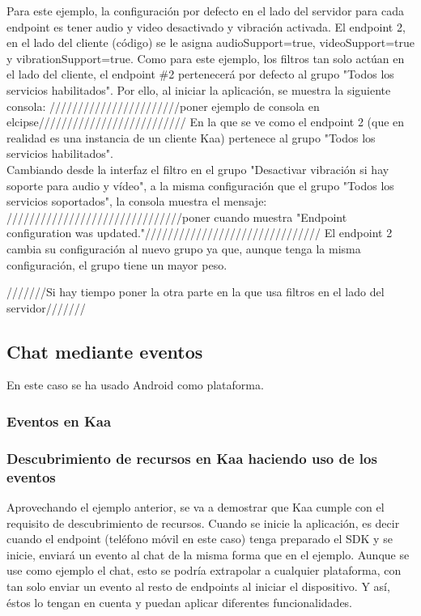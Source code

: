 \documentclass[12pt, twoside]{book}
\begin{document}
Para este ejemplo, la configuración por defecto en el lado del servidor para cada endpoint es tener audio y video desactivado y vibración activada. El endpoint 2, en el lado del cliente (código) se le asigna audioSupport=true, videoSupport=true y vibrationSupport=true. Como para este ejemplo, los filtros tan solo actúan en el lado del cliente, el endpoint \#2 pertenecerá por defecto al grupo "Todos los servicios habilitados".  Por ello, al iniciar la aplicación, se muestra la siguiente consola:  \////////////////////////poner ejemplo de consola en elcipse//////////////////////////
En la que se ve como el endpoint 2 (que en realidad es una instancia de un cliente Kaa) pertenece al grupo "Todos los servicios habilitados". \\
Cambiando desde la interfaz el filtro en el grupo "Desactivar vibración si hay soporte para audio y vídeo", a la misma configuración que el grupo "Todos los servicios soportados", la consola muestra el mensaje:  ///////////////////////////////poner cuando muestra "Endpoint configuration was updated."///////////////////////////////
El endpoint 2 cambia su configuración al nuevo grupo ya que, aunque tenga la misma configuración, el grupo tiene un mayor peso. 

///////Si hay tiempo poner la otra parte en la que usa filtros en el lado del servidor///////
 

\subsection{Chat mediante eventos}
En este caso se ha usado Android como plataforma.








\subsubsection*{Eventos en Kaa}
\subsubsection*{Descubrimiento de recursos en Kaa haciendo uso de los eventos}
Aprovechando el ejemplo anterior, se va a demostrar que Kaa cumple con el requisito de descubrimiento de recursos. Cuando se inicie la aplicación, es decir cuando el endpoint (teléfono móvil en este caso) tenga preparado el SDK y se inicie, enviará un evento al chat de la misma forma que en el ejemplo. Aunque se use como ejemplo el chat, esto se podría extrapolar a cualquier plataforma, con tan solo enviar un evento al resto de endpoints al iniciar el dispositivo. Y así,  éstos lo tengan en cuenta y puedan aplicar diferentes funcionalidades.
\end{document}
